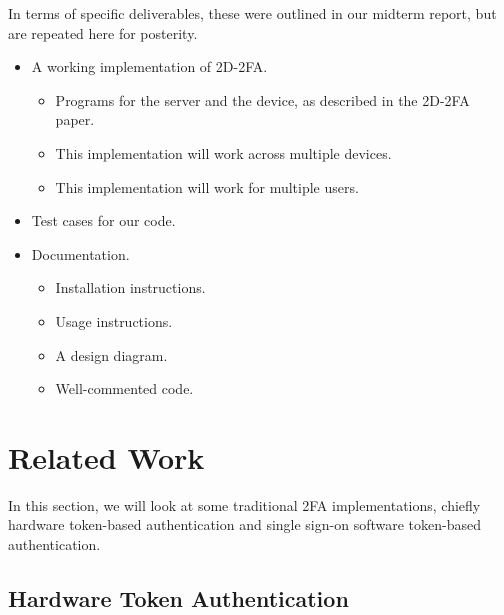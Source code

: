 \documentclass[11pt]{article} %
\begin{document}
In terms of specific deliverables, these were outlined in our midterm
report, but are repeated here for posterity.
\begin{itemize}
    \item A working implementation of 2D-2FA.

    \begin{itemize}
        \item Programs for the server and the device, as described in
        the 2D-2FA paper. 

        \item This implementation will work across multiple devices.

        \item This implementation will work for multiple users.
    \end{itemize}

    \item Test cases for our code.

    \item Documentation.

    \begin{itemize}
        \item Installation instructions.

        \item Usage instructions.

        \item A design diagram.

        \item Well-commented code.
    \end{itemize}
\end{itemize}


\section{Related Work}

In this section, we will look at some traditional 2FA implementations,
chiefly hardware token-based authentication and single sign-on software
token-based authentication.

\subsection{Hardware Token Authentication}



\end{document}
